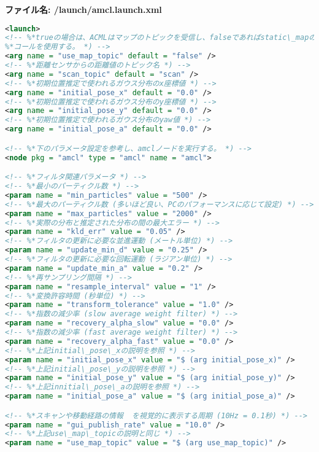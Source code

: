 \textbf{ファイル名: /launch/amcl.launch.xml}
\begin{lstlisting}[language=XML]
<launch>
<!-- %*trueの場合は、ACMLはマップのトピックを受信し、falseであればstatic\_mapのサービス*)
%*コールを使用する。 *) -->
<arg name = "use_map_topic" default = "false" />
<!-- %*距離センサからの距離値のトピック名 *) -->
<arg name = "scan_topic" default = "scan" />
<!-- %*初期位置推定で使われるガウス分布のx座標値 *) -->
<arg name = "initial_pose_x" default = "0.0" />
<!-- %*初期位置推定で使われるガウス分布のy座標値 *) -->
<arg name = "initial_pose_y" default = "0.0" />
<!-- %*初期位置推定で使われるガウス分布のyaw値 *) -->
<arg name = "initial_pose_a" default = "0.0" />

<!-- %*下のパラメータ設定を参考し、amclノードを実行する。 *) -->
<node pkg = "amcl" type = "amcl" name = "amcl">

<!-- %*フィルタ関連パラメータ *) -->
<!-- %*最小のパーティクル数 *) -->
<param name = "min_particles" value = "500" />
<!-- %*最大のパーティクル数 (多いほど良い、PCのパフォーマンスに応じて設定) *) -->
<param name = "max_particles" value = "2000" />
<!-- %*実際の分布と推定された分布の間の最大エラー *) -->
<param name = "kld_err" value = "0.05" />
<!-- %*フィルタの更新に必要な並進運動 (メートル単位) *) -->
<param name = "update_min_d" value = "0.25" />
<!-- %*フィルタの更新に必要な回転運動 (ラジアン単位) *) -->
<param name = "update_min_a" value = "0.2" />
<!-- %*再サンプリング間隔 *) -->
<param name = "resample_interval" value = "1" />
<!-- %*変換許容時間 (秒単位) *) -->
<param name = "transform_tolerance" value = "1.0" />
<!-- %*指数の減少率 (slow average weight filter) *) -->
<param name = "recovery_alpha_slow" value = "0.0" />
<!-- %*指数の減少率 (fast average weight filter) *) -->
<param name = "recovery_alpha_fast" value = "0.0" />
<!-- %*上記initial\_pose\_xの説明を参照 *) -->
<param name = "initial_pose_x" value = "$ (arg initial_pose_x)" />
<!-- %*上記initial\_pose\_yの説明を参照 *) -->
<param name = "initial_pose_y" value = "$ (arg initial_pose_y)" />
<!-- %*上記innitial\_pose\_aの説明を参照 *) -->
<param name = "initial_pose_a" value = "$ (arg initial_pose_a)" />

<!-- %*スキャンや移動経路の情報  を視覚的に表示する周期 (10Hz = 0.1秒) *) -->
<param name = "gui_publish_rate" value = "10.0" />
<!-- %*上記use\_map\_topicの説明と同じ *) -->
<param name = "use_map_topic" value = "$ (arg use_map_topic)" />


\end{lstlisting}
